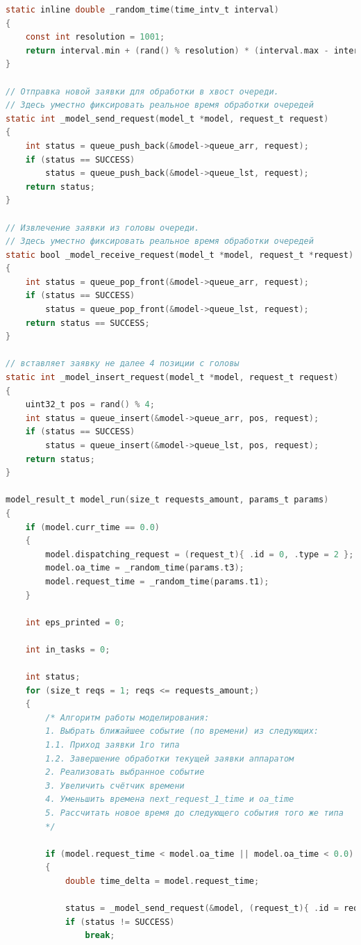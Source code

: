 \begin{lstlisting}[language=C,caption=Реализация алгоритма работы модели,label=mod:c]
static inline double _random_time(time_intv_t interval)
{
	const int resolution = 1001;
	return interval.min + (rand() % resolution) * (interval.max - interval.min) / (resolution - 1);
}

// Отправка новой заявки для обработки в хвост очереди.
// Здесь уместно фиксировать реальное время обработки очередей
static int _model_send_request(model_t *model, request_t request)
{
	int status = queue_push_back(&model->queue_arr, request);
	if (status == SUCCESS)
		status = queue_push_back(&model->queue_lst, request);
	return status;
}

// Извлечение заявки из головы очереди.
// Здесь уместно фиксировать реальное время обработки очередей
static bool _model_receive_request(model_t *model, request_t *request)
{
	int status = queue_pop_front(&model->queue_arr, request);
	if (status == SUCCESS)
		status = queue_pop_front(&model->queue_lst, request);
	return status == SUCCESS;
}

// вставляет заявку не далее 4 позиции с головы
static int _model_insert_request(model_t *model, request_t request)
{
	uint32_t pos = rand() % 4;
	int status = queue_insert(&model->queue_arr, pos, request);
	if (status == SUCCESS)
		status = queue_insert(&model->queue_lst, pos, request);
	return status;
}

model_result_t model_run(size_t requests_amount, params_t params)
{
	if (model.curr_time == 0.0)
	{
		model.dispatching_request = (request_t){ .id = 0, .type = 2 };
		model.oa_time = _random_time(params.t3);
		model.request_time = _random_time(params.t1);
	}
	
	int eps_printed = 0;
	
	int in_tasks = 0;
	
	int status;
	for (size_t reqs = 1; reqs <= requests_amount;)
	{
		/* Алгоритм работы моделирования:
		1. Выбрать ближайшее событие (по времени) из следующих:
		1.1. Приход заявки 1го типа
		1.2. Завершение обработки текущей заявки аппаратом
		2. Реализовать выбранное событие
		3. Увеличить счётчик времени
		4. Уменьшить времена next_request_1_time и oa_time
		5. Рассчитать новое время до следующего события того же типа
		*/
	
		if (model.request_time < model.oa_time || model.oa_time < 0.0) // если новая заявка пришла раньше, чем обработалась текущая
		{
			double time_delta = model.request_time;
			
			status = _model_send_request(&model, (request_t){ .id = reqs, .type = 1 });
			if (status != SUCCESS)
				break;
			

\end{lstlisting}
